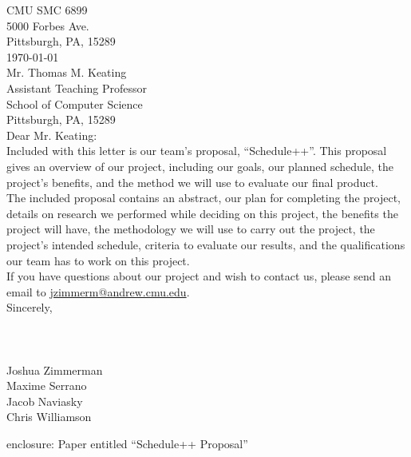 \thispagestyle{empty}
{\parindent 0pt %
CMU SMC 6899\\
5000 Forbes Ave.\\
Pittsburgh, PA, 15289\\


\today \\


Mr. Thomas M. Keating\\
Assistant Teaching Professor\\
School of Computer Science\\
Pittsburgh, PA, 15289\\


Dear Mr. Keating:\\


Included with this letter is our team's proposal, ``Schedule++''. This proposal
gives an overview of our project, including our goals, our planned schedule,
the project's benefits, and the method we will use to evaluate our final
product.\\


The included proposal contains an abstract, our plan for completing the project,
details on research we performed while deciding on this project, the benefits
the project will have, the methodology we will use to carry out the project, the
project's intended schedule, criteria to evaluate our results, and the
qualifications our team has to work on this project.\\


If you have questions about our project and wish to contact us, please send an
email to \href{mailto:jzimmerm@andrew.cmu.edu}{jzimmerm@andrew.cmu.edu}.\\


Sincerely,\\
\\
\\
\\
Joshua Zimmerman\\
Maxime Serrano\\
Jacob Naviasky\\
Chris Williamson

\vfill

enclosure: Paper entitled ``Schedule++ Proposal''
} %
\newpage

